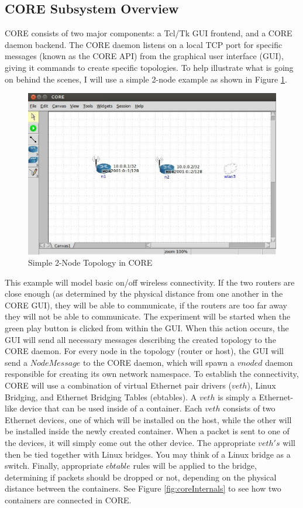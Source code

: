 \subsection{CORE Subsystem Overview}
CORE consists of two major components: a Tcl/Tk GUI frontend, and a CORE daemon backend. The CORE daemon listens on a local TCP port for specific messages (known as the CORE API) from the graphical user interface (GUI), giving it commands to create specific topologies. To help illustrate what is going on behind the scenes, I will use a simple 2-node example as shown in Figure \ref{fig:core2node}. 
\begin{figure}[t] 
      \includegraphics[width=\textwidth]{images/core2node.eps} 
    \caption{Simple 2-Node Topology in CORE} 
    \label{fig:core2node} 
  \end{figure}
This example will model basic on/off wireless connectivity. If the two routers are close enough (as determined by the physical distance from one another in the CORE GUI), they will be able to communicate, if the routers are too far away they will not be able to communicate. The experiment will be started when the green play button is clicked from within the GUI. When this action occurs, the GUI will send all necessary messages describing the created topology to the CORE daemon. For every node in the topology (router or host), the GUI will send a $Node Message$ to the CORE daemon, which will spawn a $vnoded$ daemon responsible for creating its own network namespace. To establish the connectivity, CORE will use a combination of virtual Ethernet pair drivers ($veth$), Linux Bridging, and Ethernet Bridging Tables (ebtables). A $veth$ is simply a Ethernet-like device that can be used inside of a container. Each $veth$ consists of two Ethernet devices, one of which will be installed on the host, while the other will be installed inside the newly created container. When a packet is sent to one of the devices, it will simply come out the other device. The appropriate $veth's$ will then be tied together with Linux bridges. You may think of a Linux bridge as a switch. Finally, appropriate $ebtable$ rules will be applied to the bridge, determining if packets should be dropped or not, depending on the physical distance between the containers. See Figure \ref{fig:coreInternals} to see how two containers are connected in CORE.
